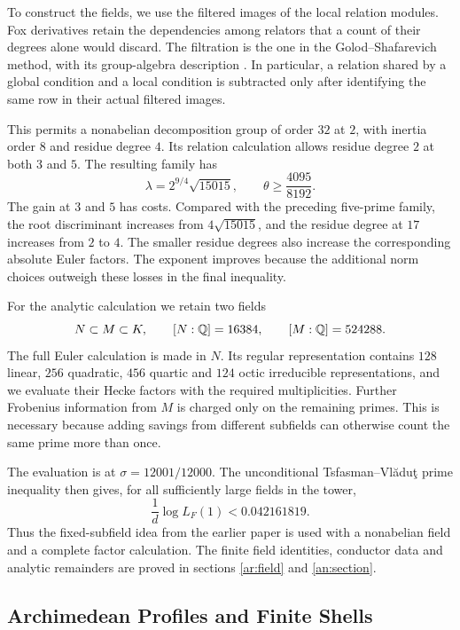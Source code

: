 To construct the fields, we use the filtered images of the local
relation modules. Fox derivatives \cite{Fox1953} retain the
dependencies among relators that a count of their degrees alone
would discard. The filtration is the one in the
Golod--Shafarevich method, with its group-algebra description
\cite{Jennings,Quillen,Ershov2012}. In particular, a relation shared
by a global condition and a local condition is subtracted only after
identifying the same row in their actual filtered images.

This permits a nonabelian decomposition group of order $32$ at $2$,
with inertia order $8$ and residue degree $4$. Its relation calculation
allows residue degree $2$ at both $3$ and $5$. The resulting family has
\[
 \lambda=2^{9/4}\sqrt{15015},\qquad
 \theta\ge\frac{4095}{8192}.
\]
The gain at $3$ and $5$ has costs. Compared with the preceding
five-prime family, the root discriminant increases from
$4\sqrt{15015}$, and the residue degree at $17$ increases from $2$
to $4$. The smaller residue degrees also increase the corresponding
absolute Euler factors. The exponent improves because the additional
norm choices outweigh these losses in the final inequality.

For the analytic calculation we retain two fields
\[
 N\subset M\subset K,\qquad
 [N:\mathbb Q]=16384,\qquad [M:\mathbb Q]=524288.
\]
The full Euler calculation is made in $N$. Its regular representation
contains $128$ linear, $256$ quadratic, $456$ quartic and $124$ octic
irreducible representations, and we evaluate their Hecke factors
with the required multiplicities. Further Frobenius information from
$M$ is charged only on the remaining primes. This is necessary because
adding savings from different subfields can otherwise count the same
prime more than once.

The evaluation is at $\sigma=12001/12000$. The unconditional
Tsfasman--Vl\u{a}du\c{t} prime inequality \cite{TsfasmanVladut2002}
then gives, for all sufficiently large fields in the tower,
\[
 \frac1d\log L_F(1)<0.042161819.
\]
Thus the fixed-subfield idea from the earlier paper is used with a
nonabelian field and a complete factor calculation. The finite
field identities, conductor data and analytic remainders are proved
in sections \ref{ar:field} and \ref{an:section}.

\subsection{Archimedean Profiles and Finite Shells}
\label{intro:profiles}

